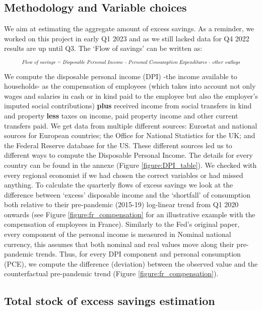 \subsection{Methodology and Variable choices}
\quad We aim at estimating the aggregate amount of excess savings. As a reminder, we worked on this project in early Q1 2023 and as we still lacked data for Q4 2022 results are up until Q3. The ‘Flow of savings’ can be written as: 
\begin{align*}
    \resizebox{.9\hsize}{!}{\textit{\mbox{Flow of savings} = \mbox{Disposable Personal Income} - \mbox{Personal Consumption Expenditures} - \mbox{other outlays}}}
\end{align*}   
\vspace{-0.05cm}
\quad We compute the disposable personal income (DPI) -the income available to households- as the compensation of employees (which takes into account not only wages and salaries in cash or in kind paid to the employee but also the employer’s imputed social contributions) \textbf{plus} received income from social transfers in kind and property \textbf{less} taxes on income, paid property income and other current transfers paid. 
We get data from multiple different sources: Eurostat and national sources for European countries; the Office for National Statistics for the UK; and the Federal Reserve database for the US. These different sources led us to different ways to compute the Disposable Personal Income. 
The details for every country can be found in the annexe (Figure \ref*{figure:DPI_table}). We checked with every regional economist if we had chosen the correct variables or had missed anything.
To calculate the quarterly flows of excess savings we look at the difference between ‘excess’ disposable income and the ‘shortfall’ of consumption both relative to their pre-pandemic (2015-19) log-linear trend from Q1 2020 onwards (see Figure \ref{figure:fr_compensation} for an illustrative example with the compensation of employees in France). 
Similarly to the Fed's original paper, every component of the personal income is measured in Nominal national currency, this assumes that both nominal and real values move along their pre-pandemic trends. 
Thus, for every DPI component and personal consumption (PCE), we compute the difference (deviation) between the observed value and the counterfactual pre-pandemic trend (Figure \ref{figure:fr_compensation}). 

\subsection{Total stock of excess savings estimation}

